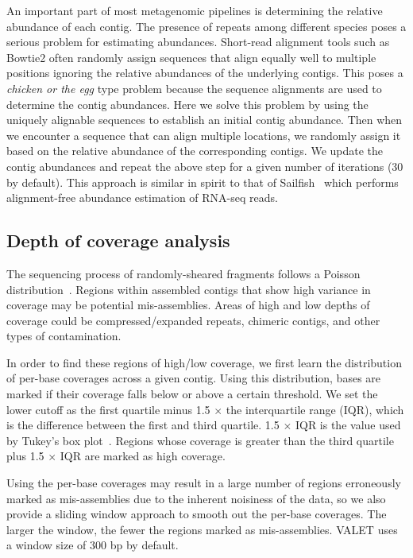 An important part of most metagenomic pipelines is determining the relative abundance of each contig.
The presence of repeats among different species poses a serious problem for estimating abundances.
Short-read alignment tools such as Bowtie2 often randomly assign sequences that align equally well to multiple positions ignoring the relative abundances of the underlying contigs.
This poses a \emph{chicken or the egg} type problem because the sequence alignments are used to determine the contig abundances.
Here we solve this problem by using the uniquely alignable sequences to establish an initial contig abundance.
Then when we encounter a sequence that can align multiple locations, we randomly assign it based on the relative abundance of the corresponding contigs.
We update the contig abundances and repeat the above step for a given number of iterations (30 by default).
This approach is similar in spirit to that of Sailfish~\cite{patro2014sailfish} which performs alignment-free abundance estimation of RNA-seq reads.

\subsection{Depth of coverage analysis}
The sequencing process of randomly-sheared fragments follows a Poisson distribution~\cite{lander1988genomic}.  Regions within assembled contigs that show high variance in coverage may be potential mis-assemblies.  Areas of high and low depths of coverage could be compressed/expanded repeats, chimeric contigs, and other types of contamination.

In order to find these regions of high/low coverage, we first learn the distribution of per-base coverages across a given contig.  Using this distribution, bases are marked if their coverage falls below or above a certain threshold.  We set the lower cutoff as the first quartile minus 1.5 $\times$ the interquartile range (IQR), which is the difference between the first and third quartile. 1.5 $\times$ IQR is the value used by Tukey’s box plot~\cite{mcgill1978variations}.  Regions whose coverage is greater than the third quartile plus 1.5 $\times$ IQR are marked as high coverage.

Using the per-base coverages may result in a large number of regions erroneously marked as mis-assemblies due to the inherent noisiness of the data, so we also provide a sliding window approach to smooth out the per-base coverages. The larger the window, the fewer the regions marked as mis-assemblies.
VALET uses a window size of 300 bp by default.

